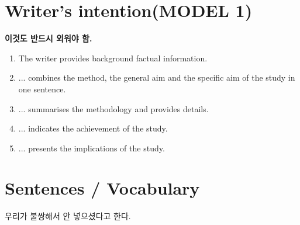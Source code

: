 \documentclass[10pt]{report}
\begin{document}
	\section{Writer's intention(MODEL 1)}
	\textbf{이것도 반드시 외워야 함.}
	\begin{enumerate}
		\item The writer provides background factual information.
		\item ... combines the method, the general aim and the specific aim of the study in one sentence.
		\item ... summarises the methodology and provides details.
		\item ... indicates the achievement of the study.
		\item ... presents the implications of the study.
	\end{enumerate}
	
	\section{Sentences / Vocabulary}
	우리가 불쌍해서 안 넣으셨다고 한다.
	
	\appendix
\end{document}

